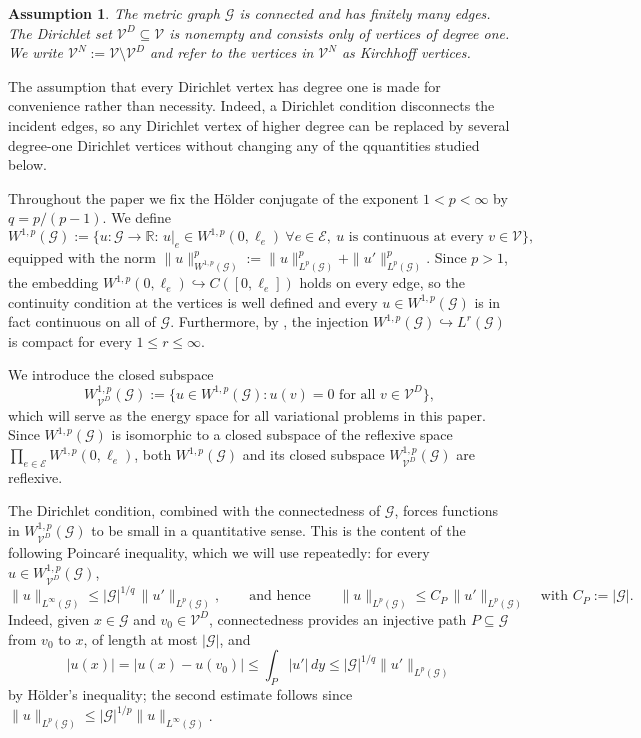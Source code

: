 \documentclass[12pt,a4paper]{article}
\numberwithin{equation}{section}
\newtheorem{assumption}[theorem]{Assumption}
\newcommand{\WpD}{W^{1,p}_{\mathcal{V}^D}(\mathcal G)}
\begin{document}
\begin{assumption}\label{ass:main}
	The metric graph $\mathcal G$ is connected and has finitely many edges.
	The \emph{Dirichlet set} $\mathcal{V}^D\subseteq \mathcal{V}$ is nonempty and consists only of
	vertices of degree one. We write $\mathcal{V}^N:=\mathcal{V}\setminus\mathcal{V}^D$ and refer to the vertices
	in $\mathcal{V}^N$ as \emph{Kirchhoff vertices}.
\end{assumption}

The assumption that every Dirichlet vertex has degree one is made for
convenience rather than necessity. Indeed, a Dirichlet condition
disconnects the incident edges, so any Dirichlet vertex of higher degree
can be replaced by several degree-one Dirichlet vertices without changing
any of the qquantities studied below.


Throughout the paper we fix the
H\"older conjugate of the exponent $1<p<\infty$ by $q=p/(p-1)$.
We define
\[
W^{1,p}(\mathcal G):=
\bigl\{u:\mathcal G\to\mathbb R:\,
u|_e\in W^{1,p}(0,\ell_e)\ \forall e\in \mathcal{E},
\ u\text{ is continuous at every }v\in \mathcal{V}
\bigr\},
\]
equipped with the norm
\(
\|u\|_{W^{1,p}(\mathcal G)}^p
:=
\|u\|_{L^p(\mathcal{G})}^p
+
\|u'\|_{L^p(\mathcal{G})}^p
.
\)
Since $p>1$, the embedding
$W^{1,p}(0,\ell_e)\hookrightarrow C([0,\ell_e])$
holds on every edge, so the continuity condition at the vertices is
well defined and every $u\in W^{1,p}(\mathcal G)$ is in fact continuous on
all of $\mathcal G$. Furthermore, by \cite[Theorem~2.2]{DR}, the injection
\(
W^{1,p}(\mathcal G)\hookrightarrow L^r(\mathcal G)
\)
is compact for every $1\le r\le\infty$.

We introduce the closed subspace
\[
\WpD
:=
\{u\in W^{1,p}(\mathcal G):u(v)=0 \text{ for all }v\in \mathcal{V}^D\},
\]
which will serve as the energy space for all variational problems in
this paper. Since $W^{1,p}(\mathcal G)$ is isomorphic to a closed
subspace of the reflexive space
$\prod_{e\in\mathcal E}W^{1,p}(0,\ell_e)$, both $W^{1,p}(\mathcal G)$
and its closed subspace $\WpD$ are reflexive.

The Dirichlet condition, combined with the connectedness of
$\mathcal G$, forces functions in $\WpD$ to be small in a quantitative
sense. This is the content of the following Poincar\'e inequality, which
we will use repeatedly: for every $u\in\WpD$,
\[
\|u\|_{L^\infty(\mathcal G)}
\le
|\mathcal G|^{1/q}\,\|u'\|_{L^p(\mathcal G)},
\qquad\text{and hence}\qquad
\|u\|_{L^p(\mathcal G)}
\le
C_P\,\|u'\|_{L^p(\mathcal G)}
\quad\text{with }C_P:=|\mathcal G|.
\]
Indeed, given $x\in\mathcal G$ and $v_0\in\mathcal V^D$, connectedness
provides an injective path $P\subseteq\mathcal G$ from $v_0$ to $x$, of
length at most $|\mathcal G|$, and
\[
|u(x)|=|u(x)-u(v_0)|
\le\int_P|u'|\,dy
\le|\mathcal G|^{1/q}\|u'\|_{L^p(\mathcal G)}
\]
by H\"older's inequality; the second estimate follows since
$\|u\|_{L^p(\mathcal G)}\le|\mathcal G|^{1/p}\|u\|_{L^\infty(\mathcal G)}$.
\end{document}
